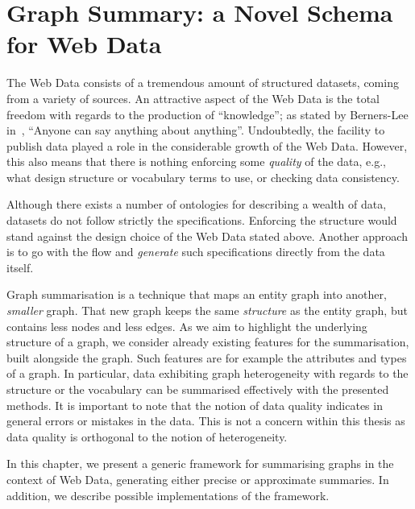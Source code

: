 \chapter{Graph Summary: a Novel Schema for Web Data}
\label{chap4:summary}

The Web Data consists of a tremendous amount of structured datasets, coming from a variety of sources. An attractive aspect of the Web Data is the total freedom with regards to the production of ``knowledge''; as stated by Berners-Lee in~\cite{tbl:1997:wam}, ``Anyone can say anything about anything''. Undoubtedly, the facility to publish data played a role in the considerable growth of the Web Data. However, this also means that there is nothing enforcing some \emph{quality} of the data, e.g., what design structure or vocabulary terms to use, or checking data consistency.

Although there exists a number of ontologies for describing a wealth of data, datasets do not follow strictly the specifications. Enforcing the structure would stand against the design choice of the Web Data stated above. Another approach is to go with the flow and \emph{generate} such specifications directly from the data itself.

Graph summarisation is a technique that maps an entity graph into another, \emph{smaller} graph. That new graph keeps the same \emph{structure} as the entity graph, but contains less nodes and less edges. %
As we aim to highlight the underlying structure of a graph, we consider already existing features for the summarisation, built alongside the graph. Such features are for example the \gls{attributes} and \gls{types} of a graph.
In particular, data exhibiting graph heterogeneity with regards to the structure or the vocabulary can be summarised effectively with the presented methods. It is important to note that the notion of data quality indicates in general errors or mistakes in the data. This is not a concern within this thesis as data quality is orthogonal to the notion of heterogeneity.

In this chapter, we present a generic framework for summarising graphs in the context of Web Data, generating either precise or approximate summaries. In addition, we describe possible implementations of the framework.

